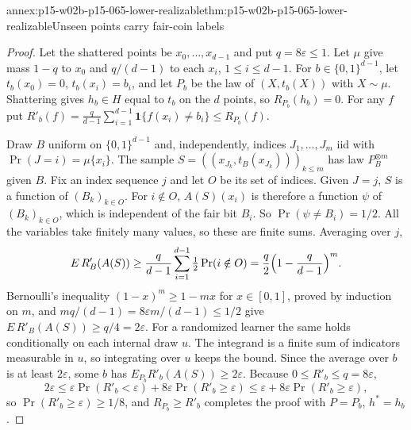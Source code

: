 \begin{annexitem}{annex:p15-w02b-p15-065-lower-realizable}{thm:p15-w02b-p15-065-lower-realizable}{Unseen points carry fair-coin labels}
\begin{proof}
Let the shattered points be \(x_0,\ldots,x_{d-1}\) and put
\(q=8\varepsilon\leq1\). Let \(\mu\) give mass \(1-q\) to \(x_0\) and
\(q/(d-1)\) to each \(x_i\), \(1\leq i\leq d-1\). For
\(b\in\{0,1\}^{d-1}\), let \(t_b(x_0)=0\), \(t_b(x_i)=b_i\), and let
\(P_b\) be the law of \((X,t_b(X))\) with \(X\sim\mu\). Shattering gives
\(h_b\in H\) equal to \(t_b\) on the \(d\) points, so \(R_{P_b}(h_b)=0\).
For any \(f\) put
\(R'_b(f)=\frac q{d-1}\sum_{i=1}^{d-1}\mathbf1\{f(x_i)\ne b_i\}\leq R_{P_b}(f)\).

Draw \(B\) uniform on \(\{0,1\}^{d-1}\) and, independently, indices
\(J_1,\ldots,J_m\) iid with \(\Pr(J=i)=\mu\{x_i\}\). The sample
\(S=((x_{J_k},t_B(x_{J_k})))_{k\leq m}\) has law \(P_B^{\otimes m}\) given
\(B\). Fix an index sequence \(j\) and let \(O\) be its set of indices. Given
\(J=j\), \(S\) is a function of \((B_k)_{k\in O}\). For \(i\notin O\),
\(A(S)(x_i)\) is therefore a function \(\psi\) of \((B_k)_{k\in O}\), which
is independent of the fair bit \(B_i\). So
\(\Pr(\psi\ne B_i)=1/2\). All the variables take finitely many values, so
these are finite sums. Averaging over \(j\),
\[
 E\,R'_B(A(S))\geq\frac q{d-1}\sum_{i=1}^{d-1}\tfrac12\Pr(i\notin O)
 =\frac q2\Bigl(1-\frac q{d-1}\Bigr)^m .
\]
Bernoulli's inequality \((1-x)^m\geq1-mx\) for \(x\in[0,1]\), proved by
induction on \(m\), and \(mq/(d-1)=8\varepsilon m/(d-1)\leq1/2\) give
\(E\,R'_B(A(S))\geq q/4=2\varepsilon\). For a randomized learner the same
holds conditionally on each internal draw \(u\). The integrand is a finite
sum of indicators measurable in \(u\), so integrating over \(u\) keeps the
bound. Since the average over \(b\) is at least \(2\varepsilon\), some \(b\)
has \(E_{P_b}R'_b(A(S))\geq2\varepsilon\). Because \(0\leq R'_b\leq q=8\varepsilon\),
\[
 2\varepsilon\leq\varepsilon\Pr(R'_b<\varepsilon)+8\varepsilon\Pr(R'_b\geq\varepsilon)
 \leq\varepsilon+8\varepsilon\Pr(R'_b\geq\varepsilon),
\]
so \(\Pr(R'_b\geq\varepsilon)\geq1/8\), and \(R_{P_b}\geq R'_b\) completes
the proof with \(P=P_b\), \(h^{*}=h_b\).
\end{proof}
\end{annexitem}

